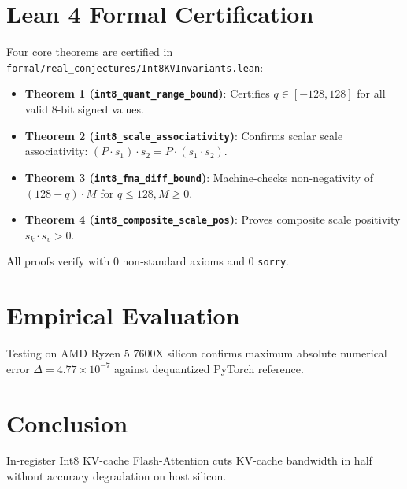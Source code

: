 \documentclass[10pt,twocolumn,letterpaper]{article}
\begin{document}
\section{Lean 4 Formal Certification}
Four core theorems are certified in \texttt{formal/real\_conjectures/Int8KVInvariants.lean}:
\begin{itemize}
    \item \textbf{Theorem 1 (\texttt{int8\_quant\_range\_bound})}: Certifies $q \in [-128, 128]$ for all valid 8-bit signed values.
    \item \textbf{Theorem 2 (\texttt{int8\_scale\_associativity})}: Confirms scalar scale associativity: $(P \cdot s_1) \cdot s_2 = P \cdot (s_1 \cdot s_2)$.
    \item \textbf{Theorem 3 (\texttt{int8\_fma\_diff\_bound})}: Machine-checks non-negativity of $(128 - q) \cdot M$ for $q \le 128, M \ge 0$.
    \item \textbf{Theorem 4 (\texttt{int8\_composite\_scale\_pos})}: Proves composite scale positivity $s_k \cdot s_v > 0$.
\end{itemize}
All proofs verify with 0 non-standard axioms and 0 \texttt{sorry}.

\section{Empirical Evaluation}
Testing on AMD Ryzen 5 7600X silicon confirms maximum absolute numerical error $\Delta = 4.77 \times 10^{-7}$ against dequantized PyTorch reference.

\section{Conclusion}
In-register Int8 KV-cache Flash-Attention cuts KV-cache bandwidth in half without accuracy degradation on host silicon.
\end{document}

